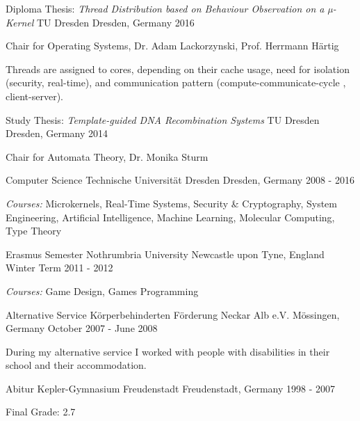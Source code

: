 \begin{cventries}
  \cventry
    {Diploma Thesis: \newline \quad
      \textit{Thread Distribution based on Behaviour Observation on a µ-Kernel}}
    {TU Dresden}
    {Dresden, Germany}
    {2016}
    {
      \begin{cvitems}
      \item{Chair for Operating Systems, Dr. Adam Lackorzynski, Prof. Herrmann
	Härtig}
      \item {Threads are assigned to cores, depending on their cache usage,
	  need for isolation (security, real-time), and communication pattern
	  (compute-communicate-cycle , client-server).}
      \end{cvitems}
    }
  \cventry
    {Study Thesis:\quad
      \textit{Template-guided DNA Recombination Systems}}
    {TU Dresden}
    {Dresden, Germany}
    {2014}
    {
      \begin{cvitems}
      \item{Chair for Automata Theory, Dr. Monika Sturm}
      \end{cvitems}
    }
  \cventry
    {Computer Science}
    {Technische Universität Dresden}
    {Dresden, Germany}
    {2008 - 2016}
    {
      \begin{cvitems}
      \item{ \textit{Courses:} Microkernels, Real-Time Systems, Security \&
	  Cryptography, System Engineering, Artificial Intelligence,
	  Machine Learning, \newline \quad Molecular Computing, Type Theory}
      \end{cvitems}
    }
  \cventry
    {Erasmus Semester}
    {Nothrumbria University}
    {Newcastle upon Tyne, England}
    {Winter Term 2011 - 2012}
    {
      \begin{cvitems}
      \item{ \textit{Courses:} Game Design, Games Programming }
      \end{cvitems}
    }
  \cventry
    {Alternative Service}
    {Körperbehinderten Förderung Neckar Alb e.V.}
    {Mössingen, Germany}
    {October 2007 - June 2008}
    {
      \begin{cvitems}
      \item {During my alternative service I worked with people with disabilities in
	their school and their accommodation.}
      \end{cvitems}
    }
  \cventry
    {Abitur}
    {Kepler-Gymnasium Freudenstadt}
    {Freudenstadt, Germany}
    {1998 - 2007}
    {
      \begin{cvitems}
      \item {Final Grade: 2.7}
      \end{cvitems}
    }
\end{cventries}
